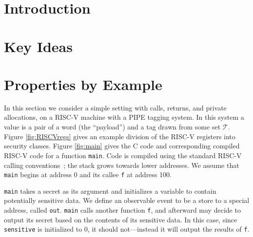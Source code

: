 \documentclass[10pt,conference]{ieeetran}%
\theoremstyle{definition}
\begin{document}
\newcommand{\paragraphx}[1]{\emph{#1.}}

\section{Introduction}



\section{Key Ideas}
\label{sec:ideas}



\section{Properties by Example}
\label{sec:example}

In this section we consider a simple setting with calls, returns, and private allocations,
on a RISC-V machine with a PIPE tagging system. In this system a value is a pair of a
word (the ``payload'') and a tag drawn from some set \(\mathcal{T}\).
Figure \ref{fig:RISCVregs} gives an example division of the RISC-V registers into
security classes.
Figure \ref{fig:main} gives the C code and corresponding compiled RISC-V code
for a function {\tt main}. Code is compiled using the standard RISC-V
calling conventions~\cite{??}; the stack grows towards lower addresses. We assume that
{\tt main} begins at address 0 and its callee {\tt f} at address 100.

{\tt main} takes a secret as its argument and initializes a variable to contain
potentially sensitive data. We define an observable event to be a store
to a special address, called {\tt out}.
{\tt main} calls another function {\tt f},
and afterward may decide to output its secret based on the contents of
its sensitive data. In this case, since {\tt sensitive} is initialized to 0,
it should not---instead it will output the results of {\tt f}.
\end{document}
